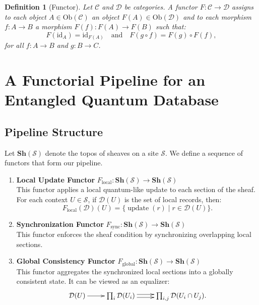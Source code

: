 \documentclass[11pt]{article}
\newtheorem{definition}{Definition}[section]
\theoremstyle{remark}
\begin{document}
\begin{definition}[Functor]
Let $\mathcal{C}$ and $\mathcal{D}$ be categories. A \emph{functor} $F: \mathcal{C} \to \mathcal{D}$ assigns to each object $A \in \mathrm{Ob}(\mathcal{C})$ an object $F(A) \in \mathrm{Ob}(\mathcal{D})$ and to each morphism $f: A \to B$ a morphism $F(f): F(A) \to F(B)$ such that:
\[
F(\mathrm{id}_A) = \mathrm{id}_{F(A)} \quad \text{and} \quad F(g \circ f) = F(g) \circ F(f),
\]
for all $f: A \to B$ and $g: B \to C$.
\end{definition}

\section{A Functorial Pipeline for an Entangled Quantum Database}

\subsection{Pipeline Structure}

Let $\mathbf{Sh}(\mathcal{S})$ denote the topos of sheaves on a site $\mathcal{S}$. We define a sequence of functors that form our pipeline.

\begin{enumerate}[label=(\alph*)]
    \item \textbf{Local Update Functor} \( F_{\text{local}}: \mathbf{Sh}(\mathcal{S}) \to \mathbf{Sh}(\mathcal{S}) \) \\
    This functor applies a local quantum-like update to each section of the sheaf. For each context \( U \in \mathcal{S} \), if \( \mathcal{D}(U) \) is the set of local records, then:
    \[
    F_{\text{local}}(\mathcal{D})(U) = \{ \operatorname{update}(r) \mid r \in \mathcal{D}(U) \}.
    \]

    \item \textbf{Synchronization Functor} \( F_{\text{sync}}: \mathbf{Sh}(\mathcal{S}) \to \mathbf{Sh}(\mathcal{S}) \) \\
    This functor enforces the sheaf condition by synchronizing overlapping local sections.

    \item \textbf{Global Consistency Functor} \( F_{\text{global}}: \mathbf{Sh}(\mathcal{S}) \to \mathbf{Sh}(\mathcal{S}) \) \\
    This functor aggregates the synchronized local sections into a globally consistent state. It can be viewed as an equalizer:
    \[
    \xymatrix{
      \mathcal{D}(U) \ar[r] & \prod_{i} \mathcal{D}(U_i) \ar@<0.5ex>[r] \ar@<-0.5ex>[r] & \prod_{i,j} \mathcal{D}(U_i \cap U_j).
    }
    \]
\end{enumerate}
\end{document}
